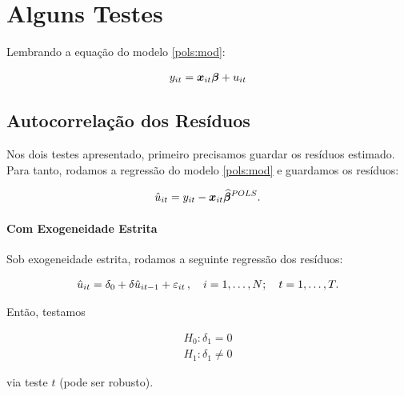 \documentclass[11pt, oneside, a4paper, article]{article}
\numberwithin{equation}{section}
\begin{document}
\clearpage
\section{Alguns Testes}

Lembrando a equação do modelo \eqref{pols:mod}:

\vspace{-2 em}
\begin{align*}
	y_{it} = \boldsymbol{x}_{it} \boldsymbol{\beta} + u_{it}
\end{align*}

\subsection{Autocorrelação dos Resíduos}

Nos dois testes apresentado, primeiro precisamos guardar os resíduos estimado.
Para tanto, rodamos a regressão do modelo \eqref{pols:mod} e guardamos os resíduos:

\vspace{-1 em}
\begin{align} \label{pols:uhat}
	\hat{u}_{it} = y_{it} - \boldsymbol{x}_{it} \widehat{\boldsymbol{\beta}}^{POLS}.
\end{align}

\paragraph{Com Exogeneidade Estrita}
Sob exogeneidade estrita, rodamos a seguinte regressão dos resíduos:

\vspace{-1.5 em}
\begin{align*}
	\hat{u}_{it} = \delta_{0} + \delta \hat{u}_{it-1}  + \varepsilon_{it}
	\, , \quad i=1,\dots, N; \quad t=1,\dots, T.
\end{align*}

\noindent
Então, testamos

\vspace{-1 em}
\begin{align*}
	H_{0} : \delta_{1} = 0
	\\
	H_{1} : \delta_{1} \neq 0
\end{align*}

\noindent
via teste $t$ (pode ser robusto).
\end{document}
